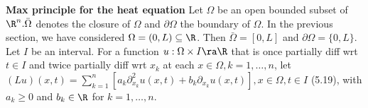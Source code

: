 {\bf Max principle for the heat equation} Let $\Omega$ be an open bounded subset of $\R^n. \bar{\Omega}$ denotes the closure of $\Omega$ and $\partial \Omega$ the boundary of $\Omega$. In the previous section, we have considered $\Omega = (0,L) \subseteq \R$. Then $\bar{\Omega} = [0,L]$ and $\partial \Omega = \{0,L\}$. Let $I$ be an interval.  For a function $u: \Omega \times I \ra \R$ that is once partially diff wrt $t \in I$ and twice partially diff wrt $x_k$ at each $x \in \Omega, k = 1, \dots , n$, let $(Lu)(x,t) = \sum_{k=1}^n [a_k \partial_{x_k}^2 u(x,t) + b_k\partial_{x_k}u(x,t)], x \in \Omega, t \in I$ (5.19), with $a_k \geq 0$ and $b_k \in \R$ for $k = 1, \dots, n$. 